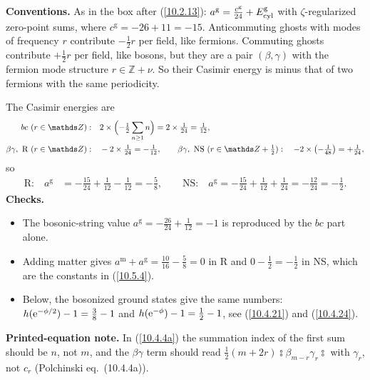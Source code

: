 	\begin{tcolorbox}[breakable]
		\begin{remark}
			\textbf{Conventions.} As in the box after (\ref{10.2.13}): $a^{\mathrm g}=\tfrac{c^{\mathrm g}}{24}+E^{\mathrm g}_{\rm cyl}$ with $\zeta$-regularized zero-point sums, where $c^{\mathrm g}=-26+11=-15$. Anticommuting ghosts with modes of frequency $r$ contribute $-\tfrac12r$ per field, like fermions. Commuting ghosts contribute $+\tfrac12r$ per field, like bosons, but they are a pair $(\beta,\gamma)$ with the fermion mode structure $r\in\mathds Z+\nu$. So their Casimir energy is minus that of two fermions with the same periodicity.

			The Casimir energies are
			\begin{align*}
				bc\ (r\in\mathds Z):&\quad 2\times\Bigl(-\tfrac12\sum_{n\ge1}n\Bigr)=2\times\tfrac1{24}=\tfrac1{12},\\
				\beta\gamma,\ \text{R}\ (r\in\mathds Z):&\quad -2\times\tfrac1{24}=-\tfrac1{12},\qquad
				\beta\gamma,\ \text{NS}\ (r\in\mathds Z+\tfrac12):\quad -2\times\bigl(-\tfrac1{48}\bigr)=+\tfrac1{24},
			\end{align*}
			so
			\begin{align*}
				\text{R:}\quad a^{\mathrm g}&=-\frac{15}{24}+\frac1{12}-\frac1{12}=-\frac58,\qquad
				\text{NS:}\quad a^{\mathrm g}=-\frac{15}{24}+\frac1{12}+\frac1{24}=-\frac{12}{24}=-\frac12 .
			\end{align*}
			\textbf{Checks.}
			\begin{itemize}
				\item The bosonic-string value $a^{\mathrm g}=-\tfrac{26}{24}+\tfrac1{12}=-1$ is reproduced by the $bc$ part alone.
				\item Adding matter gives $a^{\mathrm m}+a^{\mathrm g}=\tfrac{10}{16}-\tfrac58=0$ in R and $0-\tfrac12=-\tfrac12$ in NS, which are the constants in (\ref{10.5.4}).
				\item Below, the bosonized ground states give the same numbers: $h(\mathrm{e}^{-\phi/2})-1=\tfrac38-1$ and $h(\mathrm{e}^{-\phi})-1=\tfrac12-1$, see (\ref{10.4.21}) and (\ref{10.4.24}).
			\end{itemize}
			\textbf{Printed-equation note.} In (\ref{10.4.4a}) the summation index of the first sum should be $n$, not $m$, and the $\beta\gamma$ term should read $\tfrac12(m+2r)\typecolon\beta_{m-r}\gamma_r\typecolon$ with $\gamma_r$, not $c_r$ (Polchinski eq.\ (10.4.4a)).
		\end{remark}
	\end{tcolorbox}
	
